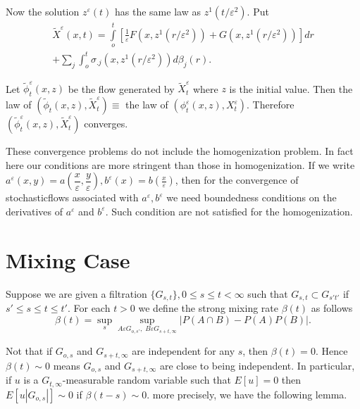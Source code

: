 Now the solution $z^\varepsilon (t)$ has the same law as 
$z^1(t/ \varepsilon^2)$. Put
\begin{multline*}
  \tilde{X}^\varepsilon (x,t) = \int\limits^t_o
  \left[\frac{1}{\varepsilon}F(x,z^1(r/ \varepsilon^2))+ 
    G(x,z^1 (r/ \varepsilon^2))\right]dr \\
  + \sum _j \int ^t_o \sigma_{.j} (x,z^1(r/ \varepsilon^2))d \beta _j
  (r). \tag{3.9.25}\label{c3:eq3.9.25} 
\end{multline*}

Let $\tilde{\phi}^\varepsilon _t (x,z)$ be the flow generated by
$\tilde{X}^\varepsilon _t$ where $z$ is the initial value. Then the law of
$(\tilde{\phi}_t(x,z),\tilde{X}^\varepsilon _t)\equiv$ the law of 
$(\phi^\varepsilon_t (x,z), X^\varepsilon_t)$. Therefore $(\tilde{\phi}_t^\varepsilon
(x,z), \tilde{X}^\varepsilon_t)$ converges.  

\setcounter{remark}{2}
\begin{remark}\label{c3:rem3.9.3} %
  These convergence problems do not include the homogenization
  problem. In fact here our conditions are more stringent than those in
  homogenization. If we write $a^\varepsilon (x,y)= a(\dfrac{x}{\varepsilon},
  \dfrac{y}{\varepsilon}), b^\varepsilon (x)=b (\frac{x}{\varepsilon})$, then for the
  convergence of stochastic\pageoriginale flows associated with $a^\varepsilon, b^\varepsilon$ we need
  boundedness conditions on the derivatives of $a^\varepsilon$ and
  $b^\varepsilon$. Such condition are not satisfied for the homogenization. 
\end{remark}


\section{Mixing Case}\label{chap3:sec3.10}

Suppose we are given a filtration $\{ G_{s,t} \},0 \le s\le t< \infty$
such that $G_{s,t}\subset G_{s't'}$ if $s' \le s \le t \le t'$. For
each $t>0$ we define the strong mixing rate $\beta (t)$ as follows 
\begin{equation*}
  \beta (t)= \sup_s \sup_{A \varepsilon G_{o,s'}, \;  B \varepsilon G_{s+t,
      \infty}} |P(A  \cap B) - P(A)P(B)|. \tag{3.10.1}\label{c3:eq3.10.1} 
\end{equation*}

Not that if $G_{o,s}$ and $G_{s+t, \infty}$ are independent for any
$s$, then $\beta (t)=0$. Hence $\beta(t) \sim 0$ means $G_{o,s}$ and
$G_{s+t, \infty}$ are close to being independent. In
particular, if $u$ is a $G_{t,\infty}$-measurable random variable such
that $E[u]=0$  then $E[u|G_{o,s}|]\sim 0$ if $\beta (t-s) \sim
0$. more precisely, we have the following lemma. 



